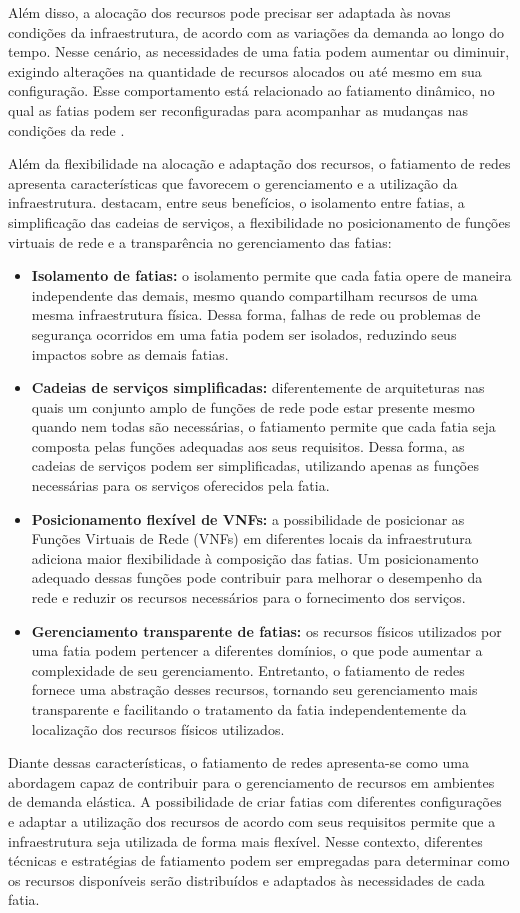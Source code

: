 Além disso, a alocação dos recursos pode precisar ser adaptada às novas condições da infraestrutura, de acordo com as variações da demanda ao longo do tempo. Nesse cenário, as necessidades de uma fatia podem aumentar ou diminuir, exigindo alterações na quantidade de recursos alocados ou até mesmo em sua configuração. Esse comportamento está relacionado ao fatiamento dinâmico, no qual as fatias podem ser reconfiguradas para acompanhar as mudanças nas condições da rede \cite{vassilaras2017algorithmic}.

Além da flexibilidade na alocação e adaptação dos recursos, o fatiamento de redes apresenta características que favorecem o gerenciamento e a utilização da infraestrutura.  destacam, entre seus benefícios, o isolamento entre fatias, a simplificação das cadeias de serviços, a flexibilidade no posicionamento de funções virtuais de rede e a transparência no gerenciamento das fatias:
\begin{itemize}
    \item \textbf{Isolamento de fatias:} o isolamento permite que cada fatia opere de maneira independente das demais, mesmo quando compartilham recursos de uma mesma infraestrutura física. Dessa forma, falhas de rede ou problemas de segurança ocorridos em uma fatia podem ser isolados, reduzindo seus impactos sobre as demais fatias.
    \item \textbf{Cadeias de serviços simplificadas:} diferentemente de arquiteturas nas quais um conjunto amplo de funções de rede pode estar presente mesmo quando nem todas são necessárias, o fatiamento permite que cada fatia seja composta pelas funções adequadas aos seus requisitos. Dessa forma, as cadeias de serviços podem ser simplificadas, utilizando apenas as funções necessárias para os serviços oferecidos pela fatia.
    \item \textbf{Posicionamento flexível de VNFs:} a possibilidade de posicionar as Funções Virtuais de Rede (VNFs) em diferentes locais da infraestrutura adiciona maior flexibilidade à composição das fatias. Um posicionamento adequado dessas funções pode contribuir para melhorar o desempenho da rede e reduzir os recursos necessários para o fornecimento dos serviços.
    \item \textbf{Gerenciamento transparente de fatias:} os recursos físicos utilizados por uma fatia podem pertencer a diferentes domínios, o que pode aumentar a complexidade de seu gerenciamento. Entretanto, o fatiamento de redes fornece uma abstração desses recursos, tornando seu gerenciamento mais transparente e facilitando o tratamento da fatia independentemente da localização dos recursos físicos utilizados.
\end{itemize}

Diante dessas características, o fatiamento de redes apresenta-se como uma abordagem capaz de contribuir para o gerenciamento de recursos em ambientes de demanda elástica. A possibilidade de criar fatias com diferentes configurações e adaptar a utilização dos recursos de acordo com seus requisitos permite que a infraestrutura seja utilizada de forma mais flexível. Nesse contexto, diferentes técnicas e estratégias de fatiamento podem ser empregadas para determinar como os recursos disponíveis serão distribuídos e adaptados às necessidades de cada fatia.